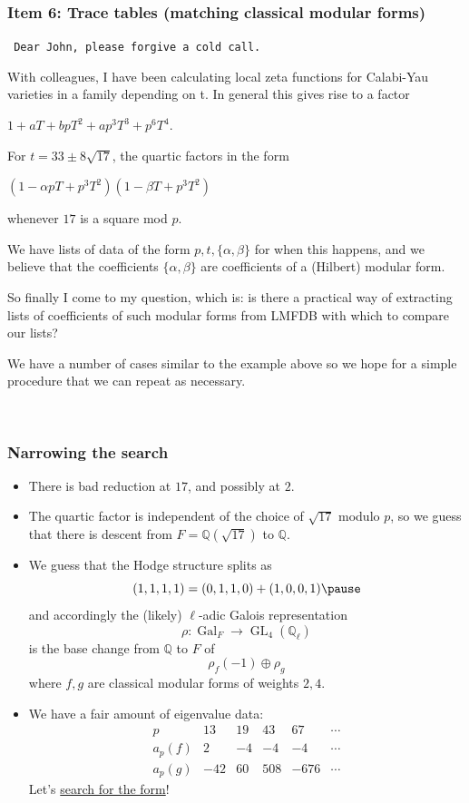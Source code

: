 \documentclass[xcolor=dvipsnames]{beamer}
\DeclareMathOperator{\Gal}{Gal}
\DeclareMathOperator{\GL}{GL}
\theoremstyle{plain}
\newcommand{\Q}{\mathbb Q}
\begin{document}
\begin{frame}[plain]
\frametitle{Item 6: Trace tables (matching classical modular forms)} \pause

{\footnotesize\tt
Dear John, please forgive a cold call.

With colleagues, I have been calculating local zeta functions for Calabi-Yau varieties in a family depending on t. In general this gives rise to a factor

$1 + a T + b p T^2 + a p^3 T^3 + p^6 T^4$.

For $t=33\pm 8 \sqrt{17}$, the quartic factors in the form

$(1 - \alpha p T + p^3 T^2) (1 - \beta T + p^3 T^2)$

whenever $17$ is a square mod $p$.

We have lists  of data of the form $p, t, \{\alpha, \beta\}$ for when this happens, and we believe that the coefficients $\{\alpha, \beta\}$ are coefficients of a (Hilbert) modular form. 

So finally I come to my question, which is: is there a practical way of extracting lists of coefficients of such modular forms from LMFDB with which to compare our lists? 

We have a number of cases similar to the example above so we hope for a simple procedure that we can repeat as necessary.

\ \\ }
\end{frame}

\begin{frame}[plain]
\frametitle{Narrowing the search} \pause

\begin{itemize}
\item There is bad reduction at $17$, and possibly at $2$.  \pause

\item The quartic factor is independent of the choice of $\sqrt{17}$ modulo $p$, so we guess that there is descent from $F=\Q(\sqrt{17})$ to $\Q$.  \pause

\item We guess that the Hodge structure splits as
\[ (1,1,1,1) = (0,1,1,0) + (1,0,0,1) \pause \]
and accordingly the (likely) $\ell$-adic Galois representation 
\[ \rho \colon \Gal_F \to \GL_4(\Q_\ell) \]
is the base change from $\Q$ to $F$ of 
\[ \rho_f(-1) \oplus \rho_g \]
where $f,g$ are classical modular forms of weights $2,4$. \pause
\item We have a fair amount of eigenvalue data:
\[ \begin{array}{c|ccccc} 
p & 13 & 19 & 43 & 67 & \cdots \\
\hline
a_p(f) & 2 & -4 & -4 & -4 & \cdots \\
a_p(g) & -42 & 60 & 508 & -676 & \cdots
\end{array} \]
Let's \href{http://cmfs.lmfdb.xyz/ModularForm/GL2/Q/holomorphic/}{search for the form}!
\end{itemize}

\ \\

\end{frame}
\end{document}
